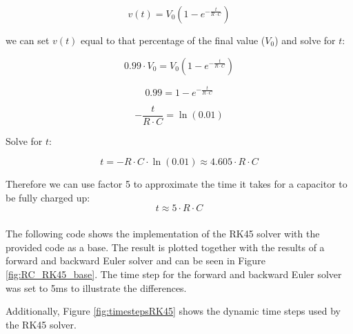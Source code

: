 \documentclass{article}
\begin{document}
    \[
        v(t) = V_0 \left(1 - e^{-\frac{t}{R \cdot C}}\right)
    \]

    we can set \(v(t)\) equal to that percentage of the final value (\(V_0\)) and solve for \(t\):

    \[
        0.99 \cdot V_0 = V_0 \left(1 - e^{-\frac{t}{R \cdot C}}\right)
    \]


    \[
        0.99 = 1 - e^{-\frac{t}{R \cdot C}}
    \]

    \[
        -\frac{t}{R \cdot C} = \ln(0.01)
    \]

    Solve for \(t\):

    \[
        t = -R \cdot C \cdot \ln(0.01) \approx 4.605 \cdot R \cdot C
    \]

    Therefore we can use factor 5 to approximate the time it takes for a capacitor to be fully charged up:
    \[
        t \approx 5 \cdot R \cdot C
    \]

    \clearpage

    \subsubsection{}
    The following code shows the implementation of the RK45 solver with the provided code as a base. The result is plotted together with the results of a forward and backward Euler solver and can be seen in Figure \ref{fig:RC_RK45_base}.
    The time step for the forward and backward Euler solver was set to 5ms to illustrate the differences.

    \vspace{10pt}
    Additionally, Figure \ref{fig:timestepsRK45} shows the dynamic time steps used by the RK45 solver.
\end{document}
